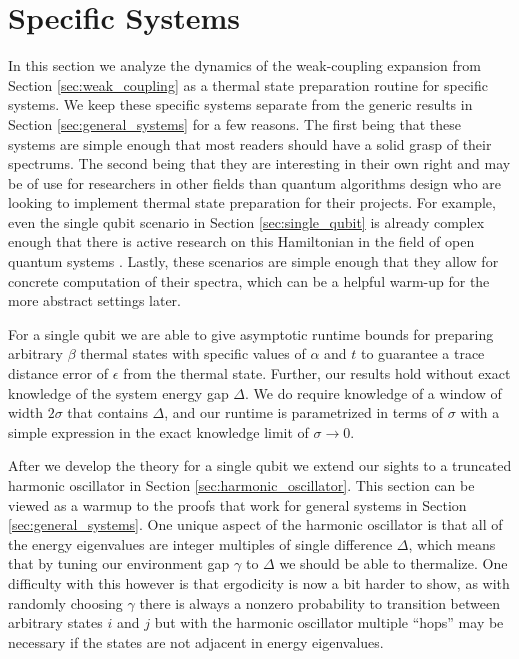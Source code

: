\documentclass[
 amsmath,amssymb,
 aps,
onecolumn, 
nofootinbib]{revtex4-2}
\begin{document}
\section{Specific Systems} \label{sec:specific_systems}
In this section we analyze the dynamics of the weak-coupling expansion from Section \ref{sec:weak_coupling} as a thermal state preparation routine for specific systems. We keep these specific systems separate from the generic results in Section \ref{sec:general_systems} for a few reasons. The first being that these systems are simple enough that most readers should have a solid grasp of their spectrums. The second being that they are interesting in their own right and may be of use for researchers in other fields than quantum algorithms design who are looking to implement thermal state preparation for their projects. For example, even the single qubit scenario in Section \ref{sec:single_qubit} is already complex enough that there is active research on this Hamiltonian in the field of open quantum systems \cite{prositto2025equilibrium}. Lastly, these scenarios are simple enough that they allow for concrete computation of their spectra, which can be a helpful warm-up for the more abstract settings later.

For a single qubit we are able to give asymptotic runtime bounds for preparing arbitrary $\beta$ thermal states with specific values of $\alpha$ and $t$ to guarantee a trace distance error of $\epsilon$ from the thermal state. Further, our results hold without exact knowledge of the system energy gap $\Delta$. We do require knowledge of a window of width $2 \sigma$ that contains $\Delta$, and our runtime is parametrized in terms of $\sigma$ with a simple expression in the exact knowledge limit of $\sigma \to 0$.

After we develop the theory for a single qubit we extend our sights to a truncated harmonic oscillator in Section \ref{sec:harmonic_oscillator}. This section can be viewed as a warmup to the proofs that work for general systems in Section \ref{sec:general_systems}. One unique aspect of the harmonic oscillator is that all of the energy eigenvalues are integer multiples of single difference $\Delta$, which means that by tuning our environment gap $\gamma$ to $\Delta$ we should be able to thermalize. One difficulty with this however is that ergodicity is now a bit harder to show, as with randomly choosing $\gamma$ there is always a nonzero probability to transition between arbitrary states $i$ and $j$ but with the harmonic oscillator multiple ``hops'' may be necessary if the states are not adjacent in energy eigenvalues.
\end{document}
